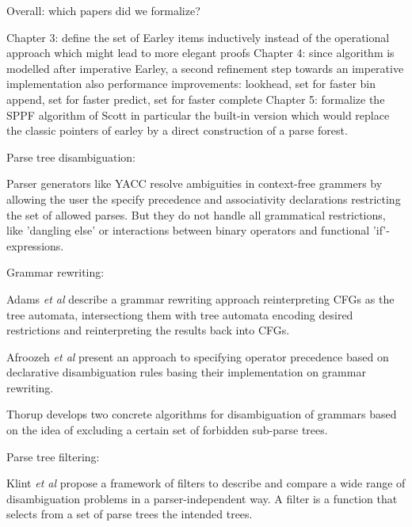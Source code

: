 \begin{isabellebody}
\begin{isamarkuptext}
Overall: which papers did we formalize?%
\end{isamarkuptext}\isamarkuptrue%
%
\isadelimdocument
%
\endisadelimdocument
%
\isatagdocument
%
\isamarkuptrue%
%
\endisatagdocument
{\isafolddocument}%
%
\isadelimdocument
%
\endisadelimdocument
%
\begin{isamarkuptext}%
Chapter 3: define the set of Earley items inductively instead of the operational approach which might lead to more elegant proofs
Chapter 4: since algorithm is modelled after imperative Earley, a second refinement step towards an imperative implementation
  also performance improvements: lookhead, set for faster bin append, set for faster predict, set for faster complete
Chapter 5: formalize the SPPF algorithm of Scott in particular the built-in version which would replace
  the classic pointers of earley by a direct construction of a parse forest.%
\end{isamarkuptext}\isamarkuptrue%
%
\begin{isamarkuptext}%
Parse tree disambiguation:

Parser generators like YACC resolve ambiguities in context-free grammers by allowing the user
the specify precedence and associativity declarations restricting the set of allowed parses. But they
do not handle all grammatical restrictions, like 'dangling else' or interactions between binary operators
and functional 'if'-expressions.

Grammar rewriting:

Adams \textit{et al} \cite{Adams:2017} describe a grammar rewriting approach reinterpreting CFGs as
the tree automata, intersectiong them with tree automata encoding desired restrictions and reinterpreting
the results back into CFGs.

Afroozeh \textit{et al} \cite{Afroozeh:2013} present an approach to specifying operator precedence
based on declarative disambiguation rules basing their implementation on grammar rewriting.

Thorup \cite{Thorup:1996} develops two concrete algorithms for disambiguation of grammars based on the idea of 
excluding a certain set of forbidden sub-parse trees.

Parse tree filtering:

Klint \textit{et al} \cite{Klint:1997} propose a framework of filters to describe and compare a wide
range of disambiguation problems in a parser-independent way. A filter is a function that selects
from a set of parse trees the intended trees.%
\end{isamarkuptext}\isamarkuptrue%
%
\isadelimtheory
%
\endisadelimtheory
%
\isatagtheory
%
\endisatagtheory
{\isafoldtheory}%
%
\isadelimtheory
%
\endisadelimtheory
%
\end{isabellebody}%
